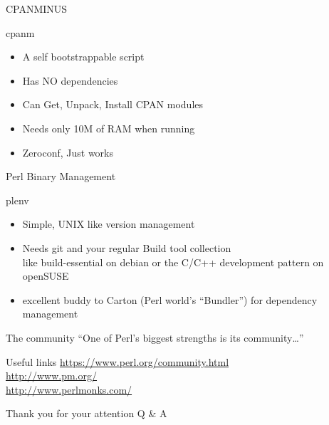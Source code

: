 \documentclass{beamer}
\begin{document}
    \begin{frame}{CPANMINUS}
        \begin{block}{cpanm}
            \begin{itemize}
                \item A self bootstrappable script
                \item Has NO dependencies
                \item Can Get, Unpack, Install CPAN modules
                \item Needs only 10M of RAM when running
                \item Zeroconf, Just works
            \end{itemize}
        \end{block}
    \end{frame}

    \begin{frame}{Perl Binary Management}
        \begin{block}{plenv}
            \begin{itemize}
                \item Simple, UNIX like version management
                \item Needs git and your regular Build tool collection \\
                    like build-essential on debian or the C/C++ development pattern on openSUSE
                \item excellent buddy to Carton (Perl world's ``Bundler'') for dependency management
            \end{itemize}
        \end{block}
    \end{frame}

    \begin{frame}{The community}
        \center\huge
        ``One of Perl's biggest strengths is its community\ldots''
    \end{frame}

    \begin{frame}{Useful links}
        \url{https://www.perl.org/community.html} \\
        \url{http://www.pm.org/} \\
        \url{http://www.perlmonks.com/}
    \end{frame}

    \begin{frame}{Thank you for your attention}
        \center\huge Q \& A
    \end{frame}
\end{document}
